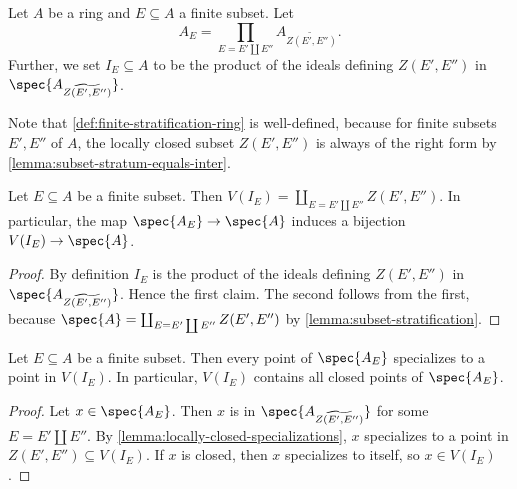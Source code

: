 \begin{definition}
    Let $A$ be a ring and $E \subseteq A$ a finite subset. Let
    \[
    A_{E} = \prod_{E = E' \coprod E''} A_{\widetilde{Z(E', E'')}}
    .\]
    Further, we set $I_E \subseteq A$ to be the product of the ideals
    defining $Z(E', E'')$ in $\spec{A_{\widetilde{Z(E', E'')}}}$.
    \label{def:finite-stratification-ring}
    \leanok
\end{definition}

Note that \ref{def:finite-stratification-ring} is well-defined, because for finite
subsets $E', E''$ of $A$, the locally closed subset $Z(E', E'')$ is always
of the right form by \ref{lemma:subset-stratum-equals-inter}.

\begin{lemma}
    Let $E \subseteq A$ be a finite subset. Then
    $V(I_E) = \coprod_{E = E' \coprod E''} Z(E', E'')$. In particular,
    the map $\spec{A_E} \to \spec{A}$ induces a bijection $V(I_E) \to \spec{A}$.
    \label{lemma:finite-stratification-ideal-bijection}
    \leanok
\end{lemma}

\begin{proof}
    \leanok
    By definition $I_E$ is the product of the ideals defining $Z(E', E'')$ in
    $\spec{A_{\widetilde{Z(E', E'')}}}$. Hence the first claim. The second
    follows from the first, because $\spec{A} = \coprod_{E = E' \coprod E''} Z(E', E'')$ by
    \ref{lemma:subset-stratification}.
\end{proof}

\begin{lemma}
    Let $E \subseteq A$ be a finite subset. Then every point of $\spec{A_E}$ specializes
    to a point in $V(I_E)$. In particular, $V(I_E)$ contains all closed points of $\spec{A_E}$.%
    \label{lemma:finite-stratification-closed-points}
    \leanok
\end{lemma}

\begin{proof}
    \leanok
    Let $x \in \spec{A_E}$. Then $x$ is in $\spec{A_{\widetilde{Z(E', E'')}}}$ for some
    $E = E' \coprod E''$. By
    \ref{lemma:locally-closed-specializations}, $x$ specializes to a point
    in $Z(E', E'') \subseteq V(I_E)$.
    If $x$ is closed, then $x$ specializes to itself, so $x \in V(I_E)$.
\end{proof}


